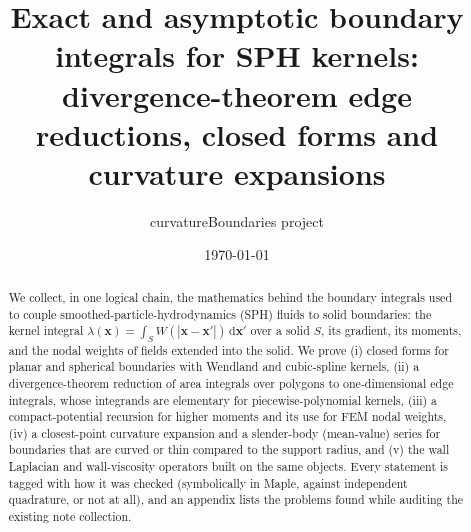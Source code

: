 \documentclass[11pt,a4paper]{article}
\title{Exact and asymptotic boundary integrals for SPH kernels:\\
divergence-theorem edge reductions, closed forms and curvature expansions}
\author{curvatureBoundaries project}
\date{\today}
\theoremstyle{definition}
\theoremstyle{remark}
\newcommand{\dd}{\mathrm{d}}
\newcommand{\xx}{\bm x}
\begin{document}
\maketitle

\begin{abstract}
We collect, in one logical chain, the mathematics behind the boundary integrals used to couple
smoothed-particle-hydrodynamics (SPH) fluids to solid boundaries: the kernel integral
$\lambda(\xx)=\int_S W(|\xx-\xx'|)\,\dd\xx'$ over a solid $S$, its gradient, its moments, and the
nodal weights of fields extended into the solid.  We prove (i) closed forms for planar and spherical
boundaries with Wendland and cubic-spline kernels, (ii) a divergence-theorem reduction of area
integrals over polygons to one-dimensional edge integrals, whose integrands are elementary for
piecewise-polynomial kernels, (iii) a compact-potential recursion for higher moments and its use for
FEM nodal weights, (iv) a closest-point curvature expansion and a slender-body (mean-value) series
for boundaries that are curved or thin compared to the support radius, and (v) the wall Laplacian
and wall-viscosity operators built on the same objects.  Every statement is tagged with how it was
checked (symbolically in Maple, against independent quadrature, or not at all), and an appendix lists
the problems found while auditing the existing note collection.
\end{abstract}

\tableofcontents












\appendix

\end{document}

